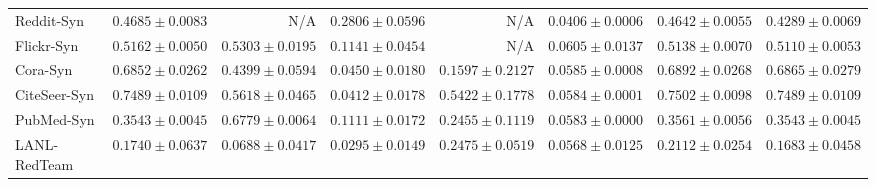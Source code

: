 \documentclass[11pt,a4paper]{article}
\begin{document}
\begin{table}[H]
\begin{tabular*}{\textwidth}{@{\extracolsep{\fill}}lrrrrrrr}
Reddit-Syn & $\mathbf{0.4685 \pm 0.0083}$ & N/A & $0.2806 \pm 0.0596$ & N/A & $0.0406 \pm 0.0006$ & $0.4642 \pm 0.0055$ & $0.4289 \pm 0.0069$ \\
Flickr-Syn & $0.5162 \pm 0.0050$ & $\mathbf{0.5303 \pm 0.0195}$ & $0.1141 \pm 0.0454$ & N/A & $0.0605 \pm 0.0137$ & $0.5138 \pm 0.0070$ & $0.5110 \pm 0.0053$ \\
Cora-Syn & $0.6852 \pm 0.0262$ & $0.4399 \pm 0.0594$ & $0.0450 \pm 0.0180$ & $0.1597 \pm 0.2127$ & $0.0585 \pm 0.0008$ & $\mathbf{0.6892 \pm 0.0268}$ & $0.6865 \pm 0.0279$ \\
CiteSeer-Syn & $0.7489 \pm 0.0109$ & $0.5618 \pm 0.0465$ & $0.0412 \pm 0.0178$ & $0.5422 \pm 0.1778$ & $0.0584 \pm 0.0001$ & $\mathbf{0.7502 \pm 0.0098}$ & $0.7489 \pm 0.0109$ \\
PubMed-Syn & $0.3543 \pm 0.0045$ & $\mathbf{0.6779 \pm 0.0064}$ & $0.1111 \pm 0.0172$ & $0.2455 \pm 0.1119$ & $0.0583 \pm 0.0000$ & $0.3561 \pm 0.0056$ & $0.3543 \pm 0.0045$ \\
\midrule
LANL-RedTeam & $0.1740 \pm 0.0637$ & $0.0688 \pm 0.0417$ & $0.0295 \pm 0.0149$ & $\mathbf{0.2475 \pm 0.0519}$ & $0.0568 \pm 0.0125$ & $0.2112 \pm 0.0254$ & $0.1683 \pm 0.0458$ \\\bottomrule
\end{tabular*}
\end{table}
\end{document}
